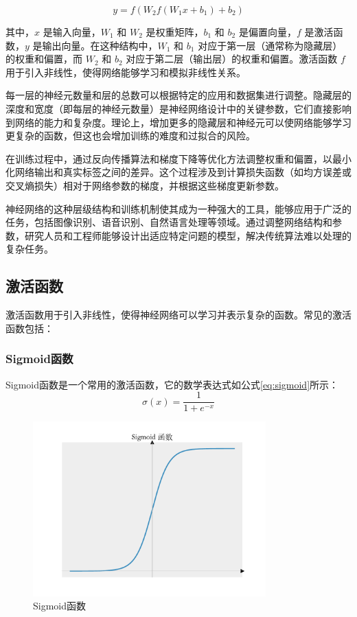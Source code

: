 \begin{equation}
    y = f(W_2 f(W_1 x + b_1) + b_2)
\end{equation}

其中，\( x \) 是输入向量，\( W_1 \) 和 \( W_2 \) 是权重矩阵，\( b_1 \) 和 \( b_2 \) 是偏置向量，\( f \) 是激活函数，\( y \) 是输出向量。在这种结构中，\( W_1 \) 和 \( b_1 \) 对应于第一层（通常称为隐藏层）的权重和偏置，而 \( W_2 \) 和 \( b_2 \) 对应于第二层（输出层）的权重和偏置。激活函数 \( f \) 用于引入非线性，使得网络能够学习和模拟非线性关系。

每一层的神经元数量和层的总数可以根据特定的应用和数据集进行调整。隐藏层的深度和宽度（即每层的神经元数量）是神经网络设计中的关键参数，它们直接影响到网络的能力和复杂度。理论上，增加更多的隐藏层和神经元可以使网络能够学习更复杂的函数，但这也会增加训练的难度和过拟合的风险。

在训练过程中，通过反向传播算法和梯度下降等优化方法调整权重和偏置，以最小化网络输出和真实标签之间的差异。这个过程涉及到计算损失函数（如均方误差或交叉熵损失）相对于网络参数的梯度，并根据这些梯度更新参数。

神经网络的这种层级结构和训练机制使其成为一种强大的工具，能够应用于广泛的任务，包括图像识别、语音识别、自然语言处理等领域。通过调整网络结构和参数，研究人员和工程师能够设计出适应特定问题的模型，解决传统算法难以处理的复杂任务。

\subsection{激活函数}\label{sec:background}
激活函数用于引入非线性，使得神经网络可以学习并表示复杂的函数。常见的激活函数包括：

\subsubsection{Sigmoid函数}
Sigmoid函数是一个常用的激活函数，它的数学表达式如公式\ref{eq:sigmoid}所示：
\begin{equation}
    \sigma(x) = \frac{1}{1 + e^{-x}}
    \label{eq:sigmoid}
\end{equation}
\begin{figure}
    \centering
    \includegraphics[width=0.8\textwidth]{Image/sigmoid.pdf}
    \caption{Sigmoid函数}
    \label{fig:sigmoid}
\end{figure}

